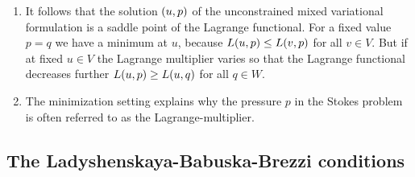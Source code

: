 \begin{remark}
	\begin{enumerate}
		\item It follows that the solution \(\parentheses*{u, p}\) of the unconstrained mixed variational formulation is a saddle point of the Lagrange functional.
		For a fixed value \(p = q\) we have a minimum at \(u\), because \(L\parentheses*{u, p} \le L\parentheses*{v, p}\) for all \(v \in V\).
		But if at fixed \(u \in V\) the Lagrange multiplier varies so that the Lagrange functional decreases further \(L\parentheses*{u, p} \ge L\parentheses*{u, q}\) for all \(q \in W\).
		\item The minimization setting explains why the pressure \(p\) in the Stokes problem is often referred to as the Lagrange-multiplier.
	\end{enumerate}
\end{remark}


\subsection{The Ladyshenskaya-Babuska-Brezzi conditions}


